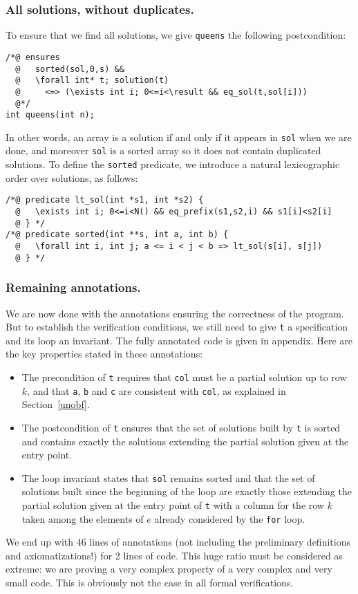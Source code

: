\documentclass[a4paper]{llncs}
\begin{document}
\subsubsection{All solutions, without duplicates.}
To ensure that we find all solutions, we give \texttt{queens} the
following postcondition:
\begin{verbatim}
/*@ ensures 
  @   sorted(sol,0,s) &&
  @   \forall int* t; solution(t) 
  @     <=> (\exists int i; 0<=i<\result && eq_sol(t,sol[i]))
  @*/
int queens(int n);
\end{verbatim}
In other words, an array is a solution if and only if it appears in
\texttt{sol} when we are done, and moreover \texttt{sol} is a sorted
array so it does not contain duplicated solutions. To define the
\texttt{sorted} predicate, we introduce a natural lexicographic order
over solutions, as follows:
\begin{verbatim}
/*@ predicate lt_sol(int *s1, int *s2) {
  @   \exists int i; 0<=i<N() && eq_prefix(s1,s2,i) && s1[i]<s2[i]
  @ } */
/*@ predicate sorted(int **s, int a, int b) {
  @   \forall int i, int j; a <= i < j < b => lt_sol(s[i], s[j])
  @ } */
\end{verbatim}

\subsubsection{Remaining annotations.} 
We are now done with the annotations ensuring the correctness of the
program. But to establish the verification conditions, we still need
to give \texttt{t} a specification and its loop an invariant. The
fully annotated code is given in appendix. Here are the key properties
stated in these annotations:
\begin{itemize}
\item The precondition of \texttt{t} requires that \texttt{col} must be a
  partial solution up to row $k$, and that \texttt{a},
  \texttt{b} and \texttt{c} are consistent with \texttt{col}, as
  explained in Section~\ref{unobf}.
\item The postcondition of \texttt{t} ensures that the set of
  solutions built by \texttt{t} is sorted and contains exactly the 
  solutions extending the partial solution given at the entry point.
\item The loop invariant states that \texttt{sol} remains sorted and
  that the set of solutions built since the beginning of the loop are
  exactly those extending the partial solution given at the entry
  point of \texttt{t} with a column for the row $k$ taken among the
  elements of $e$ already considered by the \texttt{for} loop.
\end{itemize}
We end up with 46 lines of annotations (not including the preliminary
definitions and axiomatizations!) for 2 lines of code. This huge
ratio must be considered as extreme: we are proving a very complex
property of a very complex and very small code. This is obviously not
the case in all formal verifications.
\end{document}
